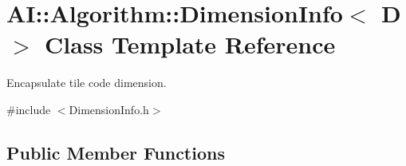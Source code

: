 \hypertarget{classAI_1_1Algorithm_1_1DimensionInfo}{\section{A\+I\+:\+:Algorithm\+:\+:Dimension\+Info$<$ D $>$ Class Template Reference}
\label{classAI_1_1Algorithm_1_1DimensionInfo}
}


Encapsulate tile code dimension.  




{\ttfamily \#include $<$Dimension\+Info.\+h$>$}

\subsection*{Public Member Functions}
